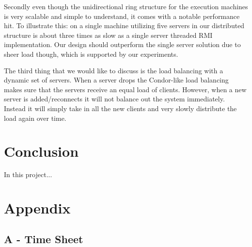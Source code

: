 \documentclass[a4paper,10pt]{article}
\begin{document}
Secondly even though the unidirectional ring structure for the execution machines is very scalable and simple to understand,
it comes with a notable performance hit.
To illustrate this: on a single machine utilizing five servers in our distributed structure is about three times as slow as a single server threaded RMI implementation.
Our design should outperform the single server solution due to sheer load though, which is supported by our experiments.

The third thing that we would like to discuss is the load balancing with a dynamic set of servers.
When a server drops the Condor-like load balancing makes sure that the servers receive an equal load of clients.
However, when a new server is added/reconnects it will not balance out the system immediately.
Instead it will simply take in all the new clients and very slowly distribute the load again over time.

\section{Conclusion}
\label{sec:conclusion}
In this project...

\newpage
\section*{Appendix}

\subsection*{A - Time Sheet}
\label{sec:appendix}



\end{document}
